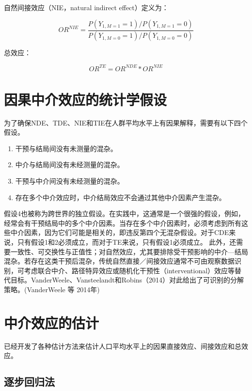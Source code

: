 \documentclass[
  chinese-hans,
  letterpaper,
  DIV=11,
  numbers=noendperiod]{scrreprt}
\begin{document}
自然间接效应（NIE，natural indirect effect）定义为：

\[{OR}^{NIE} = \frac{P(Y_{1,M = 1} = 1)/P(Y_{1,M = 1} = 0)}{P(Y_{1,M = 0} = 1)/P(Y_{1,M = 0} = 0)}\]

总效应：

\[{OR}^{TE} = {OR}^{NDE}*{OR}^{NIE}\]

\section{因果中介效应的统计学假设}\label{ux56e0ux679cux4e2dux4ecbux6548ux5e94ux7684ux7edfux8ba1ux5b66ux5047ux8bbe}

为了确保NDE、TDE、NIE和TIE在人群平均水平上有因果解释，需要有以下四个假设。

\begin{enumerate}
\def\labelenumi{\arabic{enumi}.}
\item
  干预与结局间没有未测量的混杂。
\item
  中介与结局间没有未经测量的混杂。
\item
  干预与中介间没有未经测量的混杂。
\item
  存在多个中介效应时，中介结局效应不会通过其他中介因素产生混杂。
\end{enumerate}

假设4也被称为跨世界的独立假设。在实践中，这通常是一个很强的假设，例如，经常会有干预结局中的多个中介因素。当存在多个中介因素时，必须考虑到所有这些中介因素，因为它们可能是相关的，即违反第四个无混杂假设。对于CDE来说，只有假设1和2必须成立，而对于TE来说，只有假设1必须成立。
此外，还需要一致性、可交换性与正值性；对自然效应，尤其要排除受干预影响的中介---结局混杂。若存在这类干预后混杂，传统自然直接／间接效应通常不可由观察数据识别，可考虑联合中介、路径特异效应或随机化干预性（interventional）效应等替代目标。VanderWeele、Vansteelandt和Robins（2014）对此给出了可识别的分解策略。(VanderWeele
等 2014年)

\section{中介效应的估计}\label{ux4e2dux4ecbux6548ux5e94ux7684ux4f30ux8ba1}

已经开发了各种估计方法来估计人口平均水平上的因果直接效应、间接效应和总效应。

\subsection{逐步回归法}\label{ux9010ux6b65ux56deux5f52ux6cd5}
\end{document}
